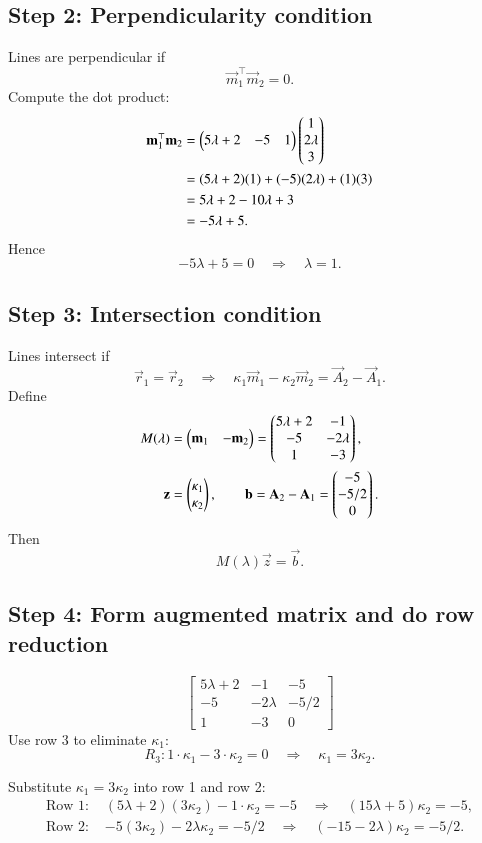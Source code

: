 \documentclass[journal]{IEEEtran}
\begin{document}
\subsection*{Step 2: Perpendicularity condition}
Lines are perpendicular if
\[
\vec m_1^{\top}\vec m_2 = 0.
\]
Compute the dot product:
\begin{align}
\mathbf m_1^{\top}\mathbf m_2
&= \begin{pmatrix}5\lambda+2 & -5 & 1\end{pmatrix} \begin{pmatrix}1\\2\lambda\\3\end{pmatrix} \\
&= (5\lambda+2)(1) + (-5)(2\lambda) + (1)(3) \\
&= 5\lambda + 2 - 10\lambda + 3 \\
&= -5\lambda + 5.
\end{align}
Hence
\[
-5\lambda + 5 = 0 \quad \Longrightarrow \quad \boxed{\lambda=1}.
\]

\subsection*{Step 3: Intersection condition}
Lines intersect if
\[
\vec r_1 = \vec r_2 \quad \Longrightarrow \quad \kappa_1 \vec m_1 - \kappa_2 \vec m_2 = \vec A_2 - \vec A_1.
\]
Define
\begin{align}
M(\lambda) &= \begin{pmatrix} \mathbf m_1 & -\mathbf m_2 \end{pmatrix} 
= \begin{pmatrix}5\lambda+2 & -1 \\ -5 & -2\lambda \\ 1 & -3\end{pmatrix}, \\
\mathbf z &= \begin{pmatrix}\kappa_1\\\kappa_2\end{pmatrix}, \qquad 
\mathbf b = \mathbf A_2 - \mathbf A_1 = \begin{pmatrix}-5\\-5/2\\0\end{pmatrix}.
\end{align}
Then
\[
M(\lambda) \vec z = \vec b.
\]

\subsection*{Step 4: Form augmented matrix and do row reduction}
\[
\left[\begin{array}{cc|c}
5\lambda+2 & -1 & -5 \\
-5 & -2\lambda & -5/2 \\
1 & -3 & 0
\end{array}\right]
\]
Use row 3 to eliminate \(\kappa_1\):
\[
R_3: 1\cdot \kappa_1 - 3\cdot \kappa_2 = 0 \quad \Rightarrow \quad \kappa_1 = 3\kappa_2.
\]

Substitute \(\kappa_1 = 3\kappa_2\) into row 1 and row 2:
\begin{align}
\text{Row 1: } & (5\lambda+2)(3\kappa_2) - 1\cdot\kappa_2 = -5 
\quad \Rightarrow \quad (15\lambda + 5)\kappa_2 = -5, \\
\text{Row 2: } & -5(3\kappa_2) - 2\lambda \kappa_2 = -5/2 
\quad \Rightarrow \quad (-15-2\lambda)\kappa_2 = -5/2.
\end{align}
\end{document}
